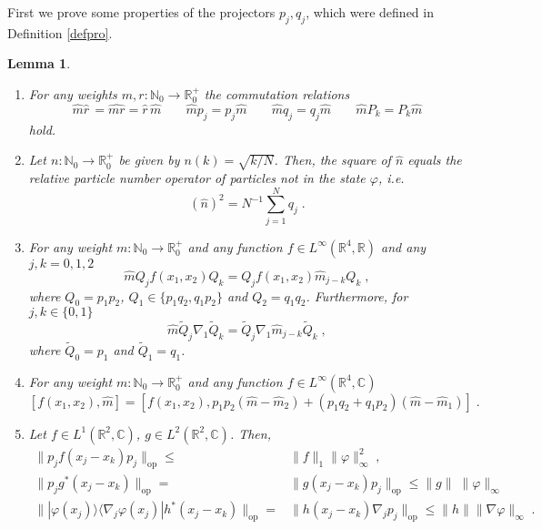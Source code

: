 \documentclass[11pt, english, american]{article}
\newcommand{\be}{\begin{equation}}
\newcommand{\ee}{\end{equation}}
\newtheorem{lemma}[theorem]{Lemma}
\renewcommand{\phi}{\varphi}
\begin{document}
First we prove some properties of the projectors $p_j,q_j$, which were defined in Definition \ref{defpro}.
\begin{lemma}\label{kombinatorik}
\begin{enumerate}
\item For any weights $m,r:\mathbb{N}_0\to\mathbb{R}^+_0$ the commutation relations
$$\widehat{m}\widehat{r}\,=\widehat{mr}=\widehat{r}\,\widehat{m}\;\;\;\;\;\;\;\widehat{m}p_j=p_j\widehat{m}\;\;\;\;\;\;\;\widehat{m}q_j=q_j\widehat{m}\;\;\;\;\;\;\;\widehat{m}P_{k}=P_{k}\widehat{m}$$
hold.
\item Let $n:\mathbb{N}_0\to\mathbb{R}^+_0$ be given by $n(k)=\sqrt{k/N}$.
Then, the square of $\widehat{n}$
equals the relative particle number operator of particles not in the
state $\phi$, i.e.
\be\label{partnumber}\left(\widehat{n}\right)^2=N^{-1}\sum_{j=1}^Nq_j\;.\ee
\item For any weight $m:\mathbb{N}_0\to\mathbb{R}^+_0$ and any function $f \in L^\infty\left(\mathbb{R}^4,\mathbb{R}\right)$ and any
$j,k=0,1,2$  $$\widehat{m} Q_j f(x_1,x_2)Q_k=
Q_j f(x_1,x_2)\widehat{m}_{j-k}Q_k\;,$$ where
$Q_0=p_1 p_2$, $Q_1\in\{p_1q_2,q_1p_2\}$ and
$Q_2=q_1q_2$.
Furthermore, for $j,k\in\{0,1\}$
$$\widehat{m} \widetilde Q_j \nabla_1 \widetilde Q_k=
\widetilde Q_j \nabla_1\widehat{m}_{j-k}\widetilde Q_k\;,$$
where
$\widetilde Q_0=p_1$ and $\widetilde Q_1=q_1$.

\item For any weight $m:\mathbb{N}_0\to\mathbb{R}^+_0$ and any function $f \in L^\infty\left(\mathbb{R}^4,\mathbb{C}\right)$
$$[f(x_1,x_2),\widehat{m}]=\left[f(x_1,x_2),p_1p_2(\widehat{m}-\widehat{m}_2)+(p_1q_2+q_1p_2)(\widehat{m}-\widehat{m}_1)\right]
\;.
$$



\item Let $f\in L^1\left(\mathbb{R}^2,\mathbb{C}\right)$, $g\in L^2\left(\mathbb{R}^2,\mathbb{C}\right)$. Then,
\begin{align}\label{kombeqa}\|p_j f(x_j-x_k)p_j\|_{\text{op}}%
\leq&  \|f\|_1\|\phi\|_\infty^2\;,
\\ \label{kombeqb}
\|p_jg^*(x_j-x_k)\|_{\text{op}}=&
\|g(x_j-x_k)p_j\|_{\text{op}}\leq  \|g\|\;\|\phi\|_\infty
\\\label{kombeqc}
\| |\phi(x_j) \rangle \langle \nabla_j \phi(x_j)| h^* (x_j-x_k)\|_{\text{op}}=&
\|h(x_j-x_k)\nabla_j p_j\|_{\text{op}}\leq  \|h\|\|\nabla\phi\|_{\infty}
\;.\end{align}

\end{enumerate}
\end{lemma}
\end{document}
